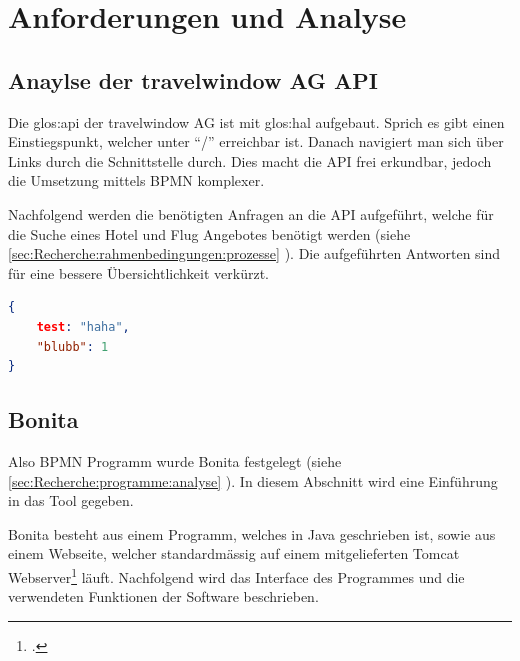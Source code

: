 

\chapter{Anforderungen und Analyse}
\label{sec:analyse}

\section{Anaylse der travelwindow AG API}
Die \Gls{glos:api} der travelwindow AG ist mit \Gls{glos:hal} aufgebaut. Sprich es gibt einen Einstiegspunkt, welcher unter "`/"' erreichbar ist. Danach navigiert man sich über Links durch die Schnittstelle durch. Dies macht die API frei erkundbar, jedoch die Umsetzung mittels BPMN komplexer.

Nachfolgend werden die benötigten Anfragen an die API aufgeführt, welche für die Suche eines Hotel und Flug Angebotes benötigt werden (siehe \cref{sec:Recherche:rahmenbedingungen:prozesse} ). Die aufgeführten Antworten sind für eine bessere Übersichtlichkeit verkürzt.


\begin{lstlisting}[language=json,firstnumber=1]
{
	test: "haha",
	"blubb": 1
}
\end{lstlisting}

\section{Bonita}
Also BPMN Programm wurde Bonita festgelegt (siehe \cref{sec:Recherche:programme:analyse} ). In diesem Abschnitt wird eine Einführung in das Tool gegeben. 

Bonita besteht aus einem Programm, welches in Java geschrieben ist, sowie aus einem Webseite, welcher standardmässig auf einem mitgelieferten Tomcat Webserver\footcite{Tomcat_2016-06-12} läuft.
Nachfolgend wird das Interface des Programmes und die verwendeten Funktionen der Software beschrieben.

